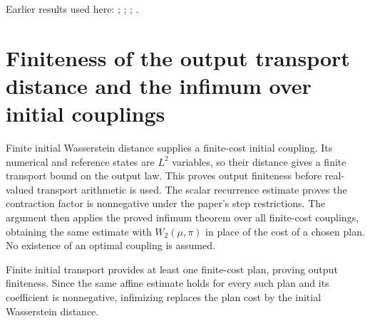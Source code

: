 \documentclass[11pt,a4paper]{article}
\begin{document}
Earlier results used here: \cite[Section~3.17.1]{LangevinLean2026ULASC}; \cite[Section~3.17.2]{LangevinLean2026ULASC}; \cite[Section~3.17.4]{LangevinLean2026ULASC}; \cite[Section~3.22.23]{LangevinLean2026ULASC}.

\section{\texorpdfstring{Finiteness of the output transport distance and the infimum over initial couplings}{Finiteness of the output transport distance and the infimum over initial couplings}}


Finite initial Wasserstein distance supplies a finite-cost initial coupling. Its numerical and reference states are \(L^{2}\) variables, so their distance gives a finite transport bound on the output law. This proves output finiteness before real-valued transport arithmetic is used. The scalar recurrence estimate proves the contraction factor is nonnegative under the paper's step restrictions. The argument then applies the proved infimum theorem over all finite-cost couplings, obtaining the same estimate with \(W_2(\mu,\pi)\) in place of the cost of a chosen plan. No existence of an optimal coupling is assumed.



Finite initial transport provides at least one finite-cost plan, proving output finiteness. Since the same affine estimate holds for every such plan and its coefficient is nonnegative, infimizing replaces the plan cost by the initial Wasserstein distance.
\end{document}
